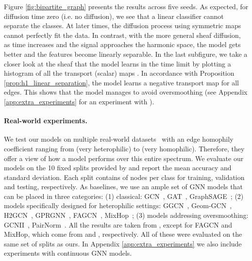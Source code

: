 \documentclass{article}
\begin{document}
Figure \ref{fig:bipartite_graph} presents the results across five seeds. As expected, for diffusion time zero (i.e. no diffusion), we see that a linear classifier cannot separate the classes. At later times, the diffusion process using symmetric maps cannot perfectly fit the data. In contrast, with the more general sheaf diffusion, as time increases and the signal approaches the harmonic space, the model gets better and the features become linearly separable. In the last subfigure, we take a closer look at the sheaf that the model learns in the time limit by plotting a histogram of all the transport (scalar) maps . In accordance with Proposition \ref{prop:h1_linear_separation}, the model learns a negative transport map for all edges. This shows that the model manages to avoid oversmoothing (see Appendix \ref{app:extra_experiments} for an experiment with ). \vspace{-5pt}

\paragraph{Real-world experiments.} We test our models on multiple real-world datasets~\citep{rozemberczki2021multi, pei2020geom, namata2012query, tang2009social, sen2008collective} with an edge homophily coefficient  ranging from  (very heterophilic) to  (very homophilic). Therefore, they offer a view of how a model performs over this entire spectrum. We evaluate our models on the 10 fixed splits provided by \citet{pei2020geom} and report the mean accuracy and standard deviation. Each split contains  of nodes per class for training, validation and testing, respectively. As baselines, we use an ample set of GNN models that can be placed in three categories: (1) classical: GCN~\citep{kipf2017graph}, GAT~\citep{velivckovic2017graph}, GraphSAGE~\citep{hamilton2017representation}; (2) models specifically designed for heterophilic settings: GGCN~\citep{yan2021two}, Geom-GCN~\citep{pei2020geom}, H2GCN~\citep{zhu2020beyond}, GPRGNN~\citep{chien2021adaptive}, FAGCN~\citep{fagcn2021}, MixHop~\citep{mixhop}; (3) models addressing oversmoothing: GCNII~\citep{pmlr-v119-chen20v}, PairNorm~\citep{Zhao2020PairNorm:}. All the results are taken from \citet{yan2021two}, except for FAGCN and MixHop, which come from \citet{lingam2021simple} and \citet{zhu2020beyond}, respectively. All of these were evaluated on the same set of splits as ours. In Appendix \ref{app:extra_experiments} we also include experiments with continuous GNN models. 
\vspace{-5pt}
\end{document}
